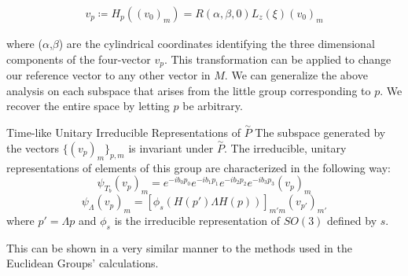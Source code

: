 \begin{equation}
\begin{aligned}
	v_p\coloneq H_p((v_0)_m)= R(\alpha,\beta,0)L_z(\xi)(v_0)_m
\end{aligned}
\end{equation}

where ($\alpha$,$\beta$) are the cylindrical coordinates identifying the three dimensional components of the four-vector $v_p$. This transformation can be applied to change our reference vector to any other vector in $M$. We can generalize the above analysis on each subspace that arises from the little group corresponding to $p$. We recover the entire space by letting $p$ be arbitrary.

\begin{theorem} Time-like Unitary Irreducible Representations of $\overset{\sim}{P}$
	The subspace generated by the vectors $\{(v_p)_m\}_{p,m}$ is invariant under $\overset{\sim}{P}$. The irreducible, unitary representations of elements of this group are characterized in the following way:
$$\psi_{T_b} (v_p)_m = e^{-ib_0p_0}e^{-ib_1p_1}e^{-ib_2p_2}e^{-ib_3p_3}(v_p)_m$$
$$\psi_\Lambda (v_p)_m = [\phi_s(H(p')\Lambda H(p))]_{m'm} (v_{p'})_{m'}$$
where $p' = \Lambda p$ and $\phi_s$ is the irreducible representation of $SO(3)$ defined by $s$.
\end{theorem}

This can be shown in a very similar manner to the methods used in the Euclidean Groups' calculations. 


